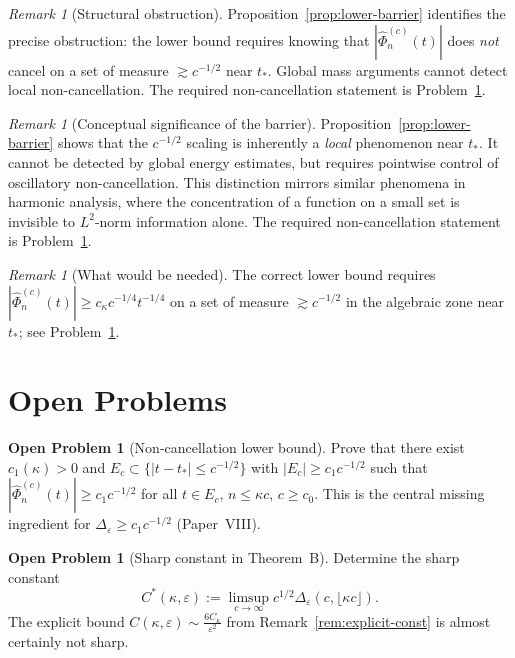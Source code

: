 \documentclass[12pt,a4paper]{amsart}
\theoremstyle{definition}
\newtheorem{problem}[theorem]{Open Problem}
\theoremstyle{remark}
\newtheorem{remark}[theorem]{Remark}
\newcommand{\tstar}{t_*}
\begin{document}
\begin{remark}[Structural obstruction]
\label{rem:structural}
Proposition~\ref{prop:lower-barrier}
identifies the precise obstruction:
the lower bound requires knowing that
$|\widehat{\Phi}_n^{(c)}(t)|$ does
\emph{not} cancel on a set of measure
$\gtrsim c^{-1/2}$ near $t_*$.
Global mass arguments cannot detect
local non-cancellation.
The required non-cancellation statement
is Problem~\ref{prob:nonvanish}.
\end{remark}

\begin{remark}[Conceptual significance of the barrier]
\label{rem:conceptual}
Proposition~\ref{prop:lower-barrier} shows that
the $c^{-1/2}$ scaling is inherently a \emph{local}
phenomenon near $t_*$.
It cannot be detected by global energy estimates,
but requires pointwise control of oscillatory
non-cancellation.
This distinction mirrors similar phenomena in
harmonic analysis, where the concentration of a
function on a small set is invisible to
$L^2$-norm information alone.
The required non-cancellation statement is
Problem~\ref{prob:nonvanish}.
\end{remark}

\begin{remark}[What would be needed]
\label{rem:lower-needed}
The correct lower bound requires
$|\widehat{\Phi}_n^{(c)}(t)| \ge c_\kappa c^{-1/4}t^{-1/4}$
on a set of measure $\gtrsim c^{-1/2}$
in the algebraic zone near $\tstar$;
see Problem~\ref{prob:nonvanish}.
\end{remark}

\section{Open Problems}
\label{sec:problems}

\begin{problem}[Non-cancellation lower bound]
\label{prob:nonvanish}
Prove that there exist $c_1(\kappa)>0$
and $E_c \subset \{|t-\tstar|\le c^{-1/2}\}$
with $|E_c| \ge c_1 c^{-1/2}$ such that
$|\widehat{\Phi}_n^{(c)}(t)| \ge c_1 c^{-1/2}$
for all $t\in E_c$, $n\le\kappa c$, $c\ge c_0$.
This is the central missing ingredient for
$\Delta_\varepsilon \ge c_1 c^{-1/2}$
(Paper~VIII).
\end{problem}

\begin{problem}[Sharp constant in Theorem~B]
\label{prob:sharp-const}
Determine the sharp constant
\[
C^*(\kappa,\varepsilon)
:= \limsup_{c\to\infty}
c^{1/2}\Delta_\varepsilon(c,\lfloor\kappa c\rfloor).
\]
The explicit bound $C(\kappa,\varepsilon)
\sim \frac{6C_\kappa}{\varepsilon^2}$
from Remark~\ref{rem:explicit-const}
is almost certainly not sharp.
\end{problem}
\end{document}
